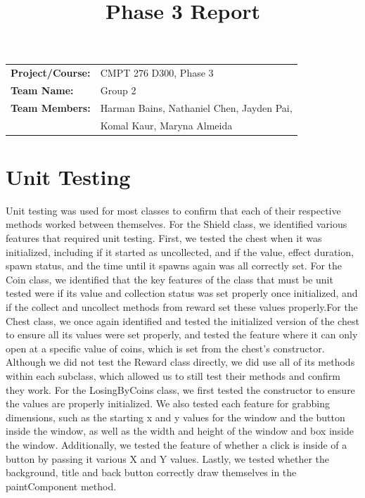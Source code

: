 \documentclass[12pt,letterpaper]{article}
\title{Phase 3 Report}
\author{}
\begin{document}
\maketitle

\begin{tabular}{ll}
\textbf{Project/Course:} & CMPT 276 D300, Phase 3 \\
\textbf{Team Name:}      & Group 2 \\
\textbf{Team Members:}   & Harman Bains, Nathaniel Chen, Jayden Pai, \\
                         & Komal Kaur, Maryna Almeida
\end{tabular}


\section{Unit Testing}
Unit testing was used for most classes to confirm that each of their respective methods worked between themselves. For the Shield class, we identified various features that required unit testing. First, we tested the chest when it was initialized, including if it started as uncollected, and if the value, effect duration, spawn status, and the time until it spawns again was all correctly set.
For the Coin class, we identified that the key features of the class that must be unit tested were if its value and collection status was set properly once initialized, and if the collect and uncollect methods from reward set these values properly.For the Chest class, we once again identified and tested the initialized version of the chest to ensure all its values were set properly, and tested the feature where it can only open at a specific value of coins, which is set from the chest's constructor. Although we did not test the Reward class directly, we did use all of its methods within each subclass, which allowed us to still test their methods and confirm they work. For the LosingByCoins class, we first tested the constructor to ensure the values are properly initialized. We also tested each feature for grabbing dimensions, such as the starting x and y values for the window and the button inside the window, as well as the width and height of the window and box inside the window. Additionally, we tested the feature of whether a click is inside of a button by passing it various X and Y values. Lastly, we tested whether the background, title and back button correctly draw themselves in the paintComponent method.
\end{document}
